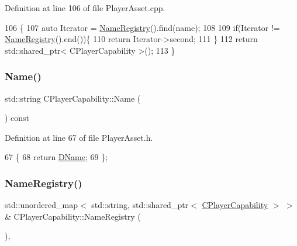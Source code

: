 Definition at line 106 of file Player\+Asset.\+cpp.


\begin{DoxyCode}
106                                                                                          \{
107     \textcolor{keyword}{auto} Iterator = \hyperlink{classCPlayerCapability_aa804d42c236f11ec9549057c22699837}{NameRegistry}().find(name);
108     
109     \textcolor{keywordflow}{if}(Iterator != \hyperlink{classCPlayerCapability_aa804d42c236f11ec9549057c22699837}{NameRegistry}().end())\{
110         \textcolor{keywordflow}{return} Iterator->second;   
111     \}
112     \textcolor{keywordflow}{return} std::shared\_ptr< CPlayerCapability >();
113 \}
\end{DoxyCode}
\hypertarget{classCPlayerCapability_a596925849a8c1f887919d57e50132782}{}\label{classCPlayerCapability_a596925849a8c1f887919d57e50132782} 
\subsubsection{\texorpdfstring{Name()}{Name()}}
{\footnotesize\ttfamily std\+::string C\+Player\+Capability\+::\+Name (\begin{DoxyParamCaption}{ }\end{DoxyParamCaption}) const\hspace{0.3cm}{\ttfamily [inline]}}



Definition at line 67 of file Player\+Asset.\+h.


\begin{DoxyCode}
67                               \{
68             \textcolor{keywordflow}{return} \hyperlink{classCPlayerCapability_aae795f4ae4c19a9c7792a4101ca18560}{DName};
69         \};
\end{DoxyCode}
\hypertarget{classCPlayerCapability_aa804d42c236f11ec9549057c22699837}{}\label{classCPlayerCapability_aa804d42c236f11ec9549057c22699837} 
\subsubsection{\texorpdfstring{Name\+Registry()}{NameRegistry()}}
{\footnotesize\ttfamily std\+::unordered\+\_\+map$<$ std\+::string, std\+::shared\+\_\+ptr$<$ \hyperlink{classCPlayerCapability}{C\+Player\+Capability} $>$ $>$ \& C\+Player\+Capability\+::\+Name\+Registry (\begin{DoxyParamCaption}{ }\end{DoxyParamCaption})\hspace{0.3cm}{\ttfamily [static]}, {\ttfamily [protected]}}



